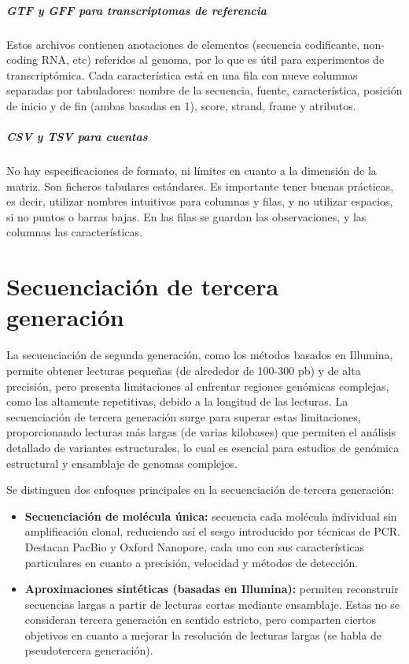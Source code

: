 \paragraph{GTF y GFF para transcriptomas de referencia} 
Estos archivos contienen anotaciones de elementos (secuencia codificante, non-coding RNA, etc) referidos al genoma, por lo que es útil para experimentos de transcriptómica. Cada característica está en una fila con nueve columnas separadas por tabuladores: nombre de la secuencia, fuente, característica, posición de inicio y de fin (ambas basadas en 1), score, strand, frame y atributos. 

\paragraph{CSV y TSV para cuentas}
No hay especificaciones de formato, ni límites en cuanto a la dimensión de la matriz. Son ficheros tabulares estándares. Es importante tener buenas prácticas, es decir, utilizar nombres intuitivos para columnas y filas, y no utilizar espacios, si no puntos o barras bajas. En las filas se guardan las observaciones, y las columnas las características. 

\chapter{Secuenciación de tercera generación}
La secuenciación de segunda generación, como los métodos basados en Illumina, permite obtener lecturas pequeñas (de alrededor de 100-300 pb) y de alta precisión, pero presenta limitaciones al enfrentar regiones genómicas complejas, como las altamente repetitivas, debido a la longitud de las lecturas. La secuenciación de tercera generación surge para superar estas limitaciones, proporcionando lecturas más largas (de varias kilobases) que permiten el análisis detallado de variantes estructurales, lo cual es esencial para estudios de genómica estructural y ensamblaje de genomas complejos.

Se distinguen dos enfoques principales en la secuenciación de tercera generación:
\begin{itemize}
\item \textbf{Secuenciación de molécula única:} secuencia cada molécula individual sin amplificación clonal, reduciendo así el sesgo introducido por técnicas de PCR. Destacan PacBio y Oxford Nanopore, cada uno con sus características particulares en cuanto a precisión, velocidad y métodos de detección.
\item \textbf{Aproximaciones sintéticas (basadas en Illumina):} permiten reconstruir secuencias largas a partir de lecturas cortas mediante ensamblaje. Estas no se consideran tercera generación en sentido estricto, pero comparten ciertos objetivos en cuanto a mejorar la resolución de lecturas largas (se habla de pseudotercera generación).
\end{itemize}

